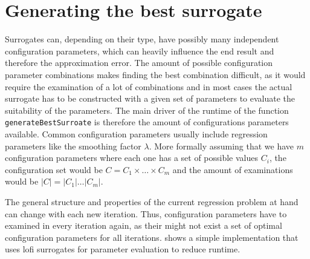 \documentclass[
  a4paper,  %
  twoside,  %
  bibliography=totoc,
  headsepline,
  cleardoublepage=empty,
  parskip=half,
  draft=false
]{scrbook}
\begin{document}
\section{Generating the best surrogate}
\label{sec:gs}

Surrogates can, depending on their type, have possibly many independent configuration parameters, which can heavily influence the end result and therefore the approximation error.
The amount of possible configuration parameter combinations makes finding the best combination difficult, as it would require the examination of a lot of combinations and in most cases the actual surrogate has to be constructed with a given set of parameters to evaluate the suitability of the parameters.
The main driver of the runtime of the function \texttt{generateBestSurroate} is therefore the amount of configurations parameters available.
Common configuration parameters usually include regression parameters like the smoothing factor $\lambda$.
More formally assuming that we have $m$ configuration parameters where each one has a set of possible values $C_i$, the configuration set would be $C=C_1 \times \dots \times C_m$ and the amount of examinations would be $|C|=|C_1| \dots |C_m|$.

The general structure and properties of the current regression problem at hand can change with each new iteration.
Thus, configuration parameters have to examined in every iteration again, as their might not exist a set of optimal configuration parameters for all iterations.
 shows a simple implementation that uses lofi surrogates for parameter evaluation to reduce runtime.
\end{document}
